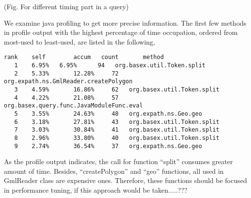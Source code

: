 (Fig. For different timing part in a query)

We examine java profiling to get more precise information. The first few methods in profile output with the highest percentage of time occupation, ordered from most-used to least-used, are listed in the following,
\begin{verbatim}
rank   	self  		accum   count   	method
   1 	6.95%  	6.95%      94  	org.basex.util.Token.split
   2  	5.33% 		12.28%     72 	org.expath.ns.GmlReader.createPolygon
   3  	4.59% 		16.86%     62  	org.basex.util.Token.split
   4  	4.22% 		21.08%     57  	org.basex.query.func.JavaModuleFunc.eval
   5  	3.55% 		24.63%     48  	org.expath.ns.Geo.geo
   6  	3.18% 		27.81%     43 	org.basex.util.Token.split
   7 	3.03% 		30.84%     41  	org.basex.util.Token.split
   8  	2.96% 		33.80%     40  	org.basex.util.Token.split
   9  	2.74% 		36.54%     37  	org.expath.ns.Geo.geo
\end{verbatim} 
 As the profile output indicates, the call for function “split” consumes greater amount of time. Besides, “createPolygon” and “geo” functions, all used in GmlReader class are expensive ones. Therefore, these functions should be focused in performance tuning, if this approach would be taken.....???











